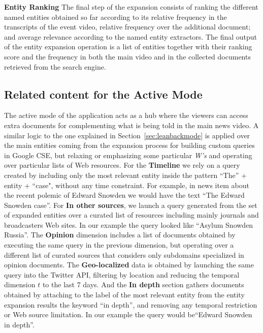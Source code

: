 \documentclass{llncs}
\begin{document}
\textbf{Entity Ranking}
The final step of the expansion consists of ranking the different named entities obtained so far according to its relative frequency in the transcripts of the event video, relative frequency over the additional document; and average relevance according to the named entity extractors. The final output of the entity expansion operation is a list of entities together with their ranking score and the frequency in both the main video and in the collected documents retrieved from the search engine.

\subsection{Related content for the Active Mode}
\label{sec:leanforwardmode}
The active mode of the application acts as a hub where the viewers can access extra documents for complementing what is being told in the main news video. A similar logic to the one explained in Section~\ref{sec:leanbackmode} is applied over the main entities coming from the expansion process for building custom queries in Google CSE, but relaxing or emphasizing some particular \emph{W's} and operating over particular lists of Web resources. For the \textbf{Timeline} we rely on a query created by including only the most relevant entity inside the pattern ``The'' + entity + ``case", without any time constraint. For example, in news item about the recent polemic of Edward Snowden we would have the text ``The Edward Snowden case''. For \textbf{In other sources}, we launch a query generated from the set of expanded entities over a curated list of resources including mainly journals and broadcasters Web sites. In our example the query looked like ``Asylum Snowden Russia''. The  \textbf{Opinion} dimension includes a list of documents obtained by executing the same query in the previous dimension, but operating over a different list of curated sources that considers only subdomains specialized in opinion documents. The \textbf{Geo-localized} data is obtained by launching the same query into the Twitter API, filtering by location and reducing the temporal dimension $t$ to the last 7 days. And the \textbf{In depth} section gathers documents obtained by attaching to the label of the most relevant entity from the entity expansion results the keyword ``in depth'', and removing any temporal restriction or Web source limitation. In our example the query would be``Edward Snowden in depth''.
		
\end{document}
